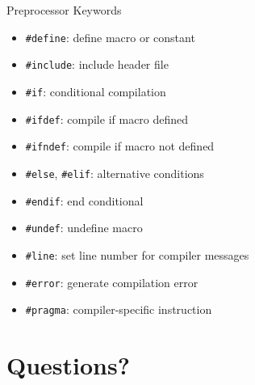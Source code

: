 \documentclass[12pt, aspectratio=169]{beamer}
\begin{document}
    \begin{frame}{Preprocessor Keywords}
        \begin{itemize}
            \item \texttt{\#define}: define macro or constant
            \item \texttt{\#include}: include header file
            \item \texttt{\#if}: conditional compilation
            \item \texttt{\#ifdef}: compile if macro defined
            \item \texttt{\#ifndef}: compile if macro not defined
            \item \texttt{\#else}, \texttt{\#elif}: alternative conditions
            \item \texttt{\#endif}: end conditional
            \item \texttt{\#undef}: undefine macro
            \item \texttt{\#line}: set line number for compiler messages
            \item \texttt{\#error}: generate compilation error
            \item \texttt{\#pragma}: compiler-specific instruction
        \end{itemize}
    \end{frame}

    \section*{Questions?}
\end{document}
